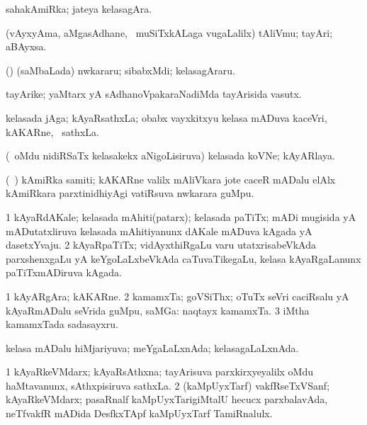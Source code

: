 \bentry
{} 
\gl{\nA}
\expl{}
\bmng
sahakAmiRka; jateya kelasagAra. 
\emng
\eentry

\bentry
{} 
\gl{\nA}
\expl{}
\bmng
(vAyxyAma, aMgasAdhane, \kanmu\ muSiTxkALaga \mo vugaLalilx) tAliVmu; tayAri; aBAyxsa. 
\emng
\eentry

\bentry
{} 
\gl{\nA}
\expl{}
\bmng
(\bava) (saMbaLada) nwkararu; sibabxMdi; kelasagAraru. 
\emng
\eentry

\bentry
{} 
\gl{\nA}
\expl{}
\bmng
tayArike; yaMtarx yA sAdhanoVpakaraNadiMda tayArisida vasutx. 
\emng
\eentry

\bentry 
{} 
\gl{\nA}
\expl{}
\bmng
kelasada jAga; kAyaRsathxLa; obabx vayxkitxyu kelasa mADuva kaceVri, kAKARne, \mo\ sathxLa. 
\emng
\eentry

\bentry
{} 
\gl{\nA}
\expl{}
\bmng
(\kanmu\ oMdu nidiRSaTx kelasakekx aNigoLisiruva) kelasada koVNe; kAyARlaya. 
\emng
\eentry

\bentry
{} 
\gl{\nA}
\expl{}
\bmng
(\kanmu\ \birx) kAmiRka samiti; kAKARne \mo valilx mAliVkara jote caceR mADalu elAlx kAmiRkara parxtinidhiyAgi vatiRsuva nwkarara guMpu. 
\emng
\eentry

\bentry
{} 
\gl{\nA}
\expl{}
\bmng
\bnum
\num{1} kAyaRdAKale; kelasada mAhiti(patarx); kelasada paTiTx; mADi mugisida yA mADutatxliruva kelasada mAhitiyanunx dAKale mADuva kAgada yA dasetxYvaju. 
\num{2} kAyaRpaTiTx; vidAyxthiRgaLu \mo varu utatxrisabeVkAda parxshenxgaLu yA keYgoLaLxbeVkAda caTuvaTikegaLu, kelasa kAyaRgaLanunx paTiTxmADiruva kAgada. 
\enum
\emng
\eentry

\bentry
{} 
\gl{\nA}
\expl{}
\bmng
\bnum
\num{1} kAyARgAra; kAKARne. 
\num{2} kamamxTa; goVSiThx; oTuTx seVri caciRsalu yA kAyaRmADalu seVrida guMpu, saMGa:  naqtayx kamamxTa. 
\num{3} iMtha kamamxTada sadasayxru. 
\enum
\emng
\eentry

\bentry
{} 
\gl{\gu}
\expl{}
\bmng
kelasa mADalu hiMjariyuva; meYgaLaLxnAda; kelasagaLaLxnAda. 
\emng
\eentry

\bentry
{} 
\gl{\nA}
\expl{}
\bmng
\bnum
\num{1} kAyaRkeVMdarx; kAyaRsAthxna; tayArisuva parxkirxyeyalilx oMdu haMtavanunx, sAthxpisiruva sathxLa. 
\num{2} (kaMpUyxTarf) vakfRseTxVSanf; kAyaRkeVMdarx; pasaRnalf kaMpUyxTarigiMtalU hecucx parxbalavAda, neTfvakfR mADida DesfkxTApf kaMpUyxTarf TamiRnalulx. 
\enum
\emng
\eentry

